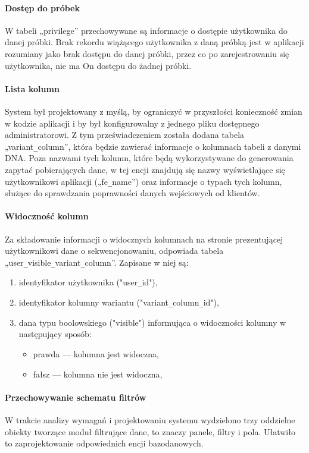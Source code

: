 \documentclass[a4paper,12pt,twoside]{article}
\begin{document}
\paragraph{Dostęp do próbek} W tabeli „privilege” przechowywane są informacje o
dostępie użytkownika do danej próbki. Brak rekordu wiążącego użytkownika z
daną próbką jest w aplikacji rozumiany jako brak dostępu do danej próbki,
przez co po zarejestrowaniu się użytkownika, nie ma On dostępu do żadnej próbki.

\paragraph{Lista kolumn} System był projektowany z myślą, by ograniczyć w przyszłości konieczność zmian
w kodzie aplikacji i by był konfigurowalny z jednego pliku dostępnego administratorowi.
Z tym przeświadczeniem została dodana tabela „variant\verb!_!column”, która będzie zawierać
informacje o kolumnach tabeli z danymi DNA. Poza nazwami tych kolumn, które będą
wykorzystywane do generowania zapytać pobierających dane, w tej encji znajdują
się nazwy wyświetlające się użytkownikowi aplikacji („fe\verb!_!name”) oraz informacje o typach
tych kolumn, służące do sprawdzania poprawności danych wejściowych od klientów.

\paragraph{Widoczność kolumn} Za składowanie informacji o widocznych kolumnach na
stronie prezentującej użytkownikowi dane o sekwencjonowaniu, odpowiada tabela \newline
„user\verb!_!visible\verb!_!variant\verb!_!column”. Zapisane w niej są:
\begin{enumerate}[1)]
\item identyfikator użytkownika ("user\verb!_!id"),
\item identyfikator kolumny wariantu ("variant\verb!_!column\verb!_!id"),
\item dana typu boolowskiego ("visible") informująca o widoczności kolumny w następujący sposób:
\begin{itemize}
\item prawda — kolumna jest widoczna,
\item fałsz — kolumna nie jest widoczna,
\end{itemize}
\end{enumerate}

\newpage
\paragraph{Przechowywanie schematu filtrów} W trakcie analizy wymagań i projektowaniu systemu wydzielono trzy oddzielne obiekty tworzące moduł filtrujące dane, to znaczy panele, filtry i pola.
Ułatwiło to zaprojektowanie odpowiednich encji bazodanowych.
\end{document}
